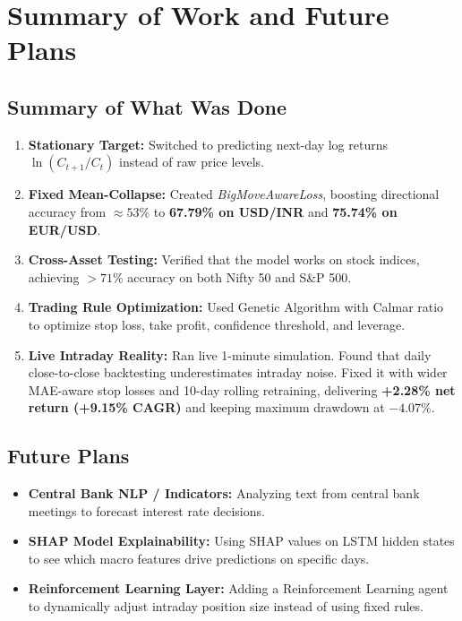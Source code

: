 \section{Summary of Work and Future Plans}

\subsection{Summary of What Was Done}
\begin{enumerate}[leftmargin=1.5cm, itemsep=1pt]
	\item \textbf{Stationary Target:} Switched to predicting next-day log returns $\ln(C_{t+1}/C_t)$ instead of raw price levels.
	\item \textbf{Fixed Mean-Collapse:} Created \textit{BigMoveAwareLoss}, boosting directional accuracy from $\approx 53\%$ to \textbf{67.79\% on USD/INR} and \textbf{75.74\% on EUR/USD}.
	\item \textbf{Cross-Asset Testing:} Verified that the model works on stock indices, achieving $>71\%$ accuracy on both Nifty 50 and S\&P 500.
	\item \textbf{Trading Rule Optimization:} Used Genetic Algorithm with Calmar ratio to optimize stop loss, take profit, confidence threshold, and leverage.
	\item \textbf{Live Intraday Reality:} Ran live 1-minute simulation. Found that daily close-to-close backtesting underestimates intraday noise. Fixed it with wider MAE-aware stop losses and 10-day rolling retraining, delivering \textbf{+2.28\% net return (+9.15\% CAGR)} and keeping maximum drawdown at \textbf{$-4.07\%$}.
\end{enumerate}

\subsection{Future Plans}
\begin{itemize}[leftmargin=1.5cm, itemsep=1pt]
	\item \textbf{Central Bank NLP / Indicators:} Analyzing text from central bank meetings to forecast interest rate decisions.
	\item \textbf{SHAP Model Explainability:} Using SHAP values on LSTM hidden states to see which macro features drive predictions on specific days.
	\item \textbf{Reinforcement Learning Layer:} Adding a Reinforcement Learning agent to dynamically adjust intraday position size instead of using fixed rules.
\end{itemize}

\vspace{0.6cm}



